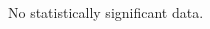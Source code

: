 \documentclass[conference]{IEEEtran}
\begin{document}
\subsection{\RQTwo}
\begin{table*}[htb]
\begin{adjustbox}{width=\textwidth}
\end{adjustbox}
\end{table*}


\subsection{\RQThree}
\begin{table*}[htb]
\begin{adjustbox}{width=\textwidth}
\end{adjustbox}
\end{table*}


\subsection{\RQFour}
No statistically significant data.

\subsection{\RQFive}

\begin{table*}[htb]
\begin{adjustbox}{width=\textwidth}
\end{adjustbox}
\end{table*}

\subsection{\RQSix}
\end{document}
